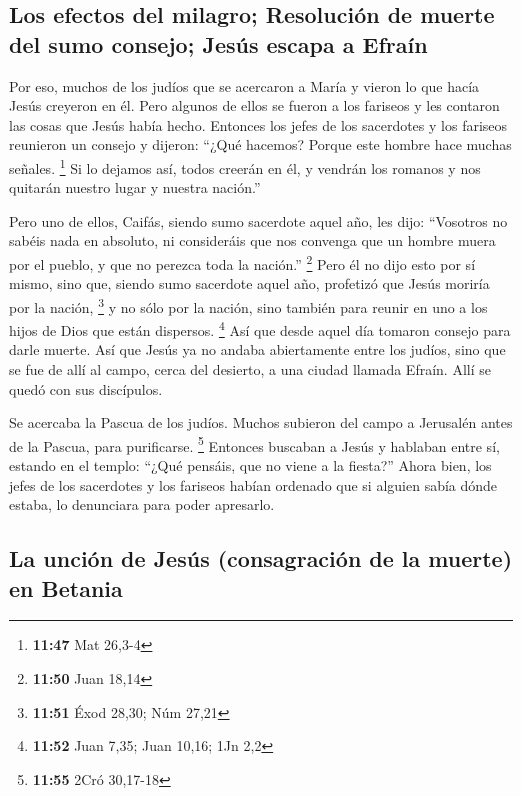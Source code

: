 \hypertarget{los-efectos-del-milagro-resoluciuxf3n-de-muerte-del-sumo-consejo-jesuxfas-escapa-a-efrauxedn}{%
\subsection{Los efectos del milagro; Resolución de muerte del sumo
consejo; Jesús escapa a
Efraín}\label{los-efectos-del-milagro-resoluciuxf3n-de-muerte-del-sumo-consejo-jesuxfas-escapa-a-efrauxedn}}

 Por eso, muchos de los judíos que se acercaron a María y
vieron lo que hacía Jesús creyeron en él.  Pero algunos
de ellos se fueron a los fariseos y les contaron las cosas que Jesús
había hecho.  Entonces los jefes de los sacerdotes y los
fariseos reunieron un consejo y dijeron: ``¿Qué hacemos? Porque este
hombre hace muchas señales. \footnote{\textbf{11:47} Mat 26,3-4}
 Si lo dejamos así, todos creerán en él, y vendrán los
romanos y nos quitarán nuestro lugar y nuestra nación.''

 Pero uno de ellos, Caifás, siendo sumo sacerdote aquel
año, les dijo: ``Vosotros no sabéis nada en absoluto,  ni
consideráis que nos convenga que un hombre muera por el pueblo, y que no
perezca toda la nación.'' \footnote{\textbf{11:50} Juan 18,14}
 Pero él no dijo esto por sí mismo, sino que, siendo sumo
sacerdote aquel año, profetizó que Jesús moriría por la nación,
\footnote{\textbf{11:51} Éxod 28,30; Núm 27,21}  y no
sólo por la nación, sino también para reunir en uno a los hijos de Dios
que están dispersos. \footnote{\textbf{11:52} Juan 7,35; Juan 10,16; 1Jn
  2,2}  Así que desde aquel día tomaron consejo para
darle muerte.  Así que Jesús ya no andaba abiertamente
entre los judíos, sino que se fue de allí al campo, cerca del desierto,
a una ciudad llamada Efraín. Allí se quedó con sus discípulos.

 Se acercaba la Pascua de los judíos. Muchos subieron del
campo a Jerusalén antes de la Pascua, para purificarse. \footnote{\textbf{11:55}
  2Cró 30,17-18}  Entonces buscaban a Jesús y hablaban
entre sí, estando en el templo: ``¿Qué pensáis, que no viene a la
fiesta?''  Ahora bien, los jefes de los sacerdotes y los
fariseos habían ordenado que si alguien sabía dónde estaba, lo
denunciara para poder apresarlo.

\hypertarget{la-unciuxf3n-de-jesuxfas-consagraciuxf3n-de-la-muerte-en-betania}{%
\subsection{La unción de Jesús (consagración de la muerte) en
Betania}\label{la-unciuxf3n-de-jesuxfas-consagraciuxf3n-de-la-muerte-en-betania}}

